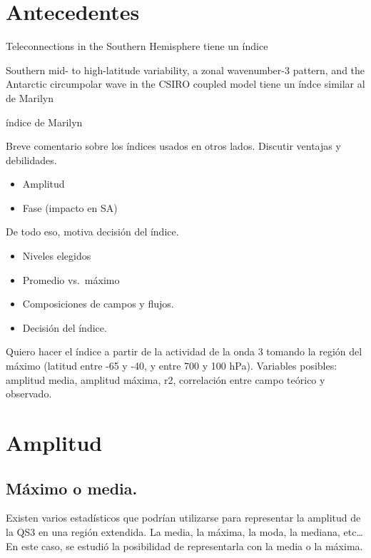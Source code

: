 \documentclass[spanish,a4paper]{book}
\providecommand{\tightlist}{%
  \setlength{\itemsep}{0pt}\setlength{\parskip}{0pt}}
\begin{document}
\section{Antecedentes}\label{antecedentes}

Teleconnections in the Southern Hemisphere tiene un índice

Southern mid- to high-latitude variability, a zonal wavenumber-3
pattern, and the Antarctic circumpolar wave in the CSIRO coupled model
tiene un índce similar al de Marilyn

índice de Marilyn

Breve comentario sobre los índices usados en otros lados. Discutir
ventajas y debilidades.

\begin{itemize}
\tightlist
\item
  Amplitud
\item
  Fase (impacto en SA)
\end{itemize}

De todo eso, motiva decisión del índice.

\begin{itemize}
\tightlist
\item
  Niveles elegidos
\item
  Promedio vs.~máximo
\item
  Composiciones de campos y flujos.
\item
  Decisión del índice.
\end{itemize}

Quiero hacer el índice a partir de la actividad de la onda 3 tomando la
región del máximo (latitud entre -65 y -40, y entre 700 y 100 hPa).
Variables posibles: amplitud media, amplitud máxima, r2, correlación
entre campo teórico y observado.

\section{Amplitud}\label{amplitud}

\subsection{Máximo o media.}\label{maximo-o-media.}

Existen varios estadísticos que podrían utilizarse para representar la
amplitud de la QS3 en una región extendida. La media, la máxima, la
moda, la mediana, etc\ldots{} En este caso, se estudió la posibilidad de
representarla con la media o la
máxima.
\end{document}
